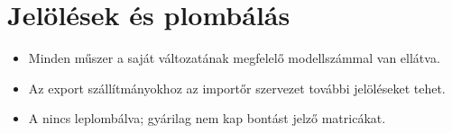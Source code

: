 \chapter{Jelölések és plombálás}\label{ch:marking}

\begin{itemize}
    \item Minden műszer a saját változatának megfelelő modellszámmal van ellátva.
    \item Az export szállítmányokhoz az importőr szervezet további jelöléseket tehet.
    \item A \ReplicaGenOne{} nincs leplombálva; gyárilag nem kap bontást jelző matricákat.
\end{itemize}
